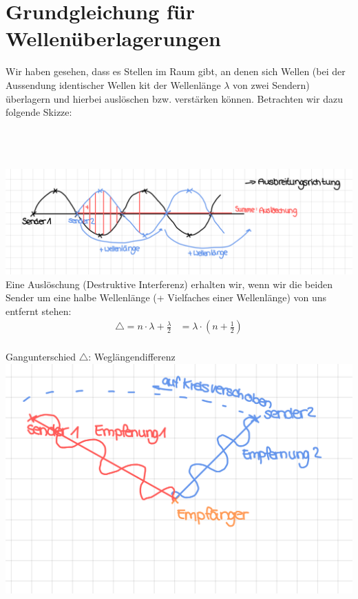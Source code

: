 \documentclass[12pt,a4paper]{report}
\begin{document}
	\setcounter{section}{12}
	\section{Grundgleichung für Wellenüberlagerungen}
	Wir haben \dq gesehen\dq, dass es Stellen im Raum gibt, an denen sich Wellen (bei der Aussendung identischer Wellen kit der Wellenlänge $\lambda$ von zwei Sendern) überlagern und hierbei auslöschen bzw. verstärken können. Betrachten wir dazu folgende Skizze:\\\\
	\\\\
	\includegraphics[width=\textwidth]{JPEG-Bild-443E-8313-20-0.JPEG}
	Eine Auslöschung (\dq Destruktive Interferenz\dq) erhalten wir, wenn wir die beiden Sender um eine halbe Wellenlänge (+ Vielfaches einer Wellenlänge) von uns entfernt stehen:
	\begin{align*}
		\bigtriangleup =n \cdot \lambda + \frac{\lambda}{2} &= \lambda \cdot (n+\frac{1}{2})
	\end{align*} \\
	Gangunterschied $\bigtriangleup$: \dq Weglängendifferenz\dq \\
	\includegraphics[width=\textwidth]{JPEG-Bild-4CCB-9E90-7A-0.JPEG}
	\newpage
\end{document}
